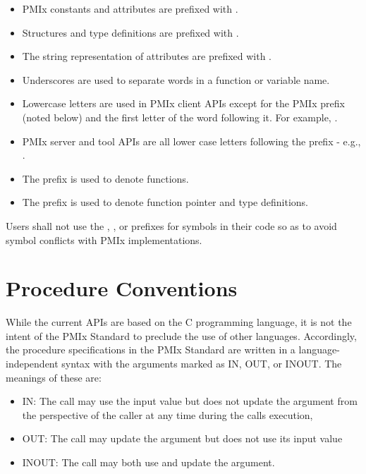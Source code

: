 \begin{itemize}
\item \ac{PMIx} constants and attributes are prefixed with \textbf{}.
\item Structures and type definitions are prefixed with .
\item The string representation of attributes are prefixed with .
\item Underscores are used to separate words in a function or variable name.
\item Lowercase letters are used in \ac{PMIx} client \acp{API} except for the \ac{PMIx} prefix (noted below) and the first letter of the word following it.
For example, .
\item \ac{PMIx} server and tool \acp{API} are all lower case letters following the prefix - e.g., .
\item The  prefix is used to denote functions.
\item The  prefix is used to denote function pointer and type definitions.
\end{itemize}

Users shall not use the \textbf{}, \textbf{}, or \textbf{} prefixes for symbols in their code so as to avoid symbol conflicts with \ac{PMIx} implementations.

\section{Procedure Conventions}

While the current \acp{API} are based on the C programming language, it is not the intent of the \ac{PMIx} Standard to preclude the use of other languages.
Accordingly, the procedure specifications in the \ac{PMIx} Standard are written in a language-independent syntax with the arguments marked as IN, OUT, or INOUT.
The meanings of these are:
\begin{itemize}
\item IN:
The call may use the input value but does not update the argument from the perspective of the caller at any time during the calls execution,
\item OUT:
The call may update the argument but does not use its input value
\item INOUT:
The call may both use and update the argument.
\end{itemize}

